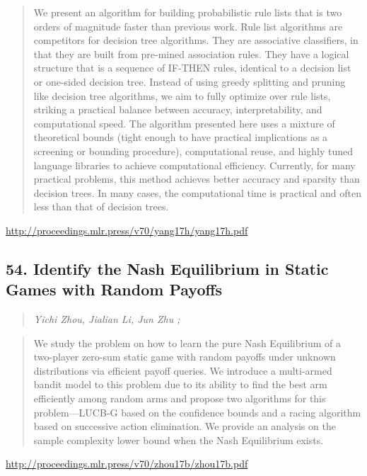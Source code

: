 \documentclass{article}
\begin{document}
\begin{quote}
    We present an algorithm for building probabilistic rule lists that is two orders of magnitude faster than previous work. Rule list algorithms are competitors for decision tree algorithms. They are associative classifiers, in that they are built from pre-mined association rules. They have a logical structure that is a sequence of IF-THEN rules, identical to a decision list or one-sided decision tree. Instead of using greedy splitting and pruning like decision tree algorithms, we aim to fully optimize over rule lists, striking a practical balance between accuracy, interpretability, and computational speed. The algorithm presented here uses a mixture of theoretical bounds (tight enough to have practical implications as a screening or bounding procedure), computational reuse, and highly tuned language libraries to achieve computational efficiency. Currently, for many practical problems, this method achieves better accuracy and sparsity than decision trees. In many cases, the computational time is practical and often less than that of decision trees.  \end{quote}

\href{http://proceedings.mlr.press/v70/yang17h/yang17h.pdf}{http://proceedings.mlr.press/v70/yang17h/yang17h.pdf}

\subsection{54. Identify the Nash Equilibrium in Static Games with Random Payoffs}

\begin{quote}
\footnotesize{\textit{Yichi Zhou, Jialian Li, Jun Zhu ;}}
\end{quote}

\begin{quote}
    We study the problem on how to learn the pure Nash Equilibrium of a two-player zero-sum static game with random payoffs under unknown distributions via efficient payoff queries. We introduce a multi-armed bandit model to this problem due to its ability to find the best arm efficiently among random arms and propose two algorithms for this problem—LUCB-G based on the confidence bounds and a racing algorithm based on successive action elimination. We provide an analysis on the sample complexity lower bound when the Nash Equilibrium exists.  \end{quote}

\href{http://proceedings.mlr.press/v70/zhou17b/zhou17b.pdf}{http://proceedings.mlr.press/v70/zhou17b/zhou17b.pdf}
\end{document}
